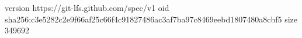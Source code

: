 version https://git-lfs.github.com/spec/v1
oid sha256:c3e5282c2e9f66af25c66f4c91827486ac3af7ba97c8469eebd1807480a8cbf5
size 349692
